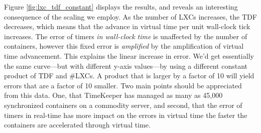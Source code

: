 Figure \ref{fig:lxc_tdf_constant} displays the results, and reveals an interesting consequence of the scaling we employ. As the number of LXCs increases, the TDF decreases, which means that the advance in virtual time per unit wall-clock tick increases.  The error of timers {\em in wall-clock time} is unaffected by the number of containers, however this fixed error is {\em amplified} by the amplification of virtual time advancement.  This explains the linear increase in error.  We'd get essentially the same curve---but with different y-axis values---by using a different constant product of TDF and \#LXCs.  A product that is larger by a factor of 10 will yield errors that are a factor of 10 smaller.   Two main points should be appreciated from this data. One, that TimeKeeper has managed as many as 45,000 synchronized containers on a commodity server, and second, that the error of timers in real-time has more impact on the errors in virtual time the faster the containers are accelerated through virtual time.

